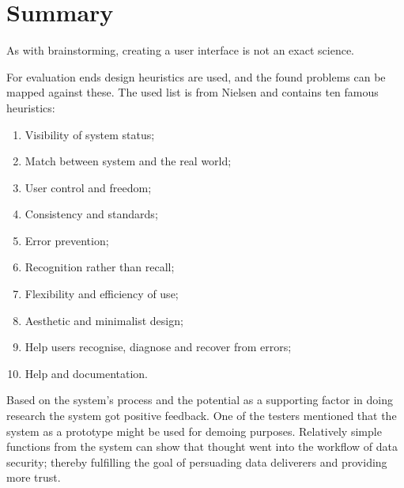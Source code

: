 \section{Summary}
\label{evaluation-summary}

As with brainstorming, creating a user interface is not an exact science.

For evaluation ends design heuristics are used, and the found problems can be mapped against these.
The used list is from Nielsen \cite{designHeuristics} and contains ten famous heuristics:

\begin{enumerate}
	\item Visibility of system status;
	\item Match between system and the real world;
	\item User control and freedom;
	\item Consistency and standards;
	\item Error prevention;
	\item Recognition rather than recall;
	\item Flexibility and efficiency of use;
	\item Aesthetic and minimalist design;
	\item Help users recognise, diagnose and recover from errors;
	\item Help and documentation.
\end{enumerate}


\noindent{} Based on the system's process and the potential as a supporting factor in doing research the system got positive feedback.
One of the testers mentioned that the system as a prototype might be used for demoing purposes. 
Relatively simple functions from the system can show that thought went into the workflow of data security;
thereby fulfilling the goal of persuading data deliverers and providing more trust.

